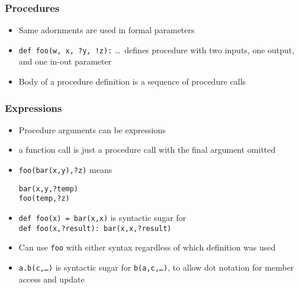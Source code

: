 \documentclass[12pt]{beamer}
\begin{document}
\begin{frame}
\frametitle{Procedures}
\begin{itemize}
\item Same adornments are used in formal parameters
\item \texttt{def foo(w, x, ?y, !z):} \ldots\ defines procedure with two
  inputs, one output, and one in-out parameter
\item Body of a procedure definition is a sequence of
  procedure calls
\end{itemize}
\end{frame}


\begin{frame}
\frametitle{Expressions}
\begin{itemize}
\item Procedure arguments can be expressions
\item a function call is just a procedure call with the final argument omitted
\item \texttt{foo(bar(x,y),?z)} \quad means \quad
  \begin{minipage}[c]{0.4\linewidth}
  \texttt{bar(x,y,?temp)} \\
  \texttt{foo(temp,?z)}
  \end{minipage}
\item \texttt{def foo(x) = bar(x,x)} is syntactic sugar for \\
\texttt{def foo(x,?result): bar(x,x,?result)}
\item Can use \texttt{foo} with either syntax regardless of which
  definition was used
\item \texttt{a.b(c,\ldots)} is syntactic sugar for
  \texttt{b(a,c,\ldots)}, to allow dot notation for member access and update
\end{itemize}
\end{frame}
\end{document}
